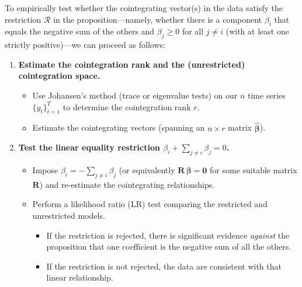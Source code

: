 To empirically test whether the cointegrating vector(s) in the data satisfy the restriction 
$\mathcal{R}$ in the proposition---namely, whether there is a component 
$\beta_i$ that equals the negative sum of the others and 
$\beta_j \ge 0$ for all $j \neq i$ (with at least one strictly positive)---we can proceed as follows:

\begin{enumerate}
    \item \textbf{Estimate the cointegration rank and the (unrestricted) cointegration space.}
    \begin{itemize}
        \item Use Johansen's method (trace or eigenvalue tests) on our $n$ time series $\{{y}_t\}_{t=1}^T$ to determine the cointegration rank $r$. 
        \item Estimate the cointegrating vectors (spanning an $n \times r$ matrix $\widehat{\boldsymbol{\beta}}$).
    \end{itemize}

    \item \textbf{Test the linear equality restriction $\beta_i + \sum_{j\neq i}\beta_j = 0$.}
    \begin{itemize}
        \item Impose $\beta_i = -\sum_{j\neq i}\beta_j$ (or equivalently $\mathbf{R}\,\boldsymbol{\beta}=\mathbf{0}$ for some suitable matrix $\mathbf{R}$) and re-estimate the cointegrating relationships. 
        \item Perform a likelihood ratio (LR) test comparing the restricted and unrestricted models. 
            \begin{itemize}
                \item If the restriction is rejected, there is significant evidence \emph{against} the proposition that one coefficient is the negative sum of all the others.
                \item If the restriction is not rejected, the data are consistent with that linear relationship.
            \end{itemize}
    \end{itemize}


\end{enumerate}
